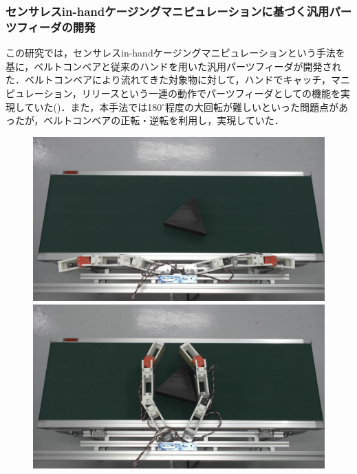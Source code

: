 \documentclass[a4paper,twoside,12pt,papersize, dvipdfmx]{iirthesis}
\begin{document}
\subsubsection{センサレスin-handケージングマニピュレーションに基づく汎用パーツフィーダの開発 \cite{kamikukita2022}}
この研究では，センサレスin-handケージングマニピュレーションという手法を基に，ベルトコンベアと従来のハンドを用いた汎用パーツフィーダが開発された．ベルトコンベアにより流れてきた対象物に対して，ハンドでキャッチ，マニピュレーション，リリースという一連の動作でパーツフィーダとしての機能を実現していた()．また，本手法では180$^\circ$程度の大回転が難しいといった問題点があったが，ベルトコンベアの正転・逆転を利用し，実現していた．
\begin{figure}[b]
\begin{minipage}{0.49\hsize}
\centering
\includegraphics[width=\hsize]{fig/Introduction/triangle_Moment_2.jpg}
\subcaption{}
\end{minipage}\hfill
\begin{minipage}{0.49\hsize}
\centering
\includegraphics[width=\hsize]{fig/Introduction/triangle_Moment_3.jpg}

\end{minipage}
\end{figure}
\end{document}

